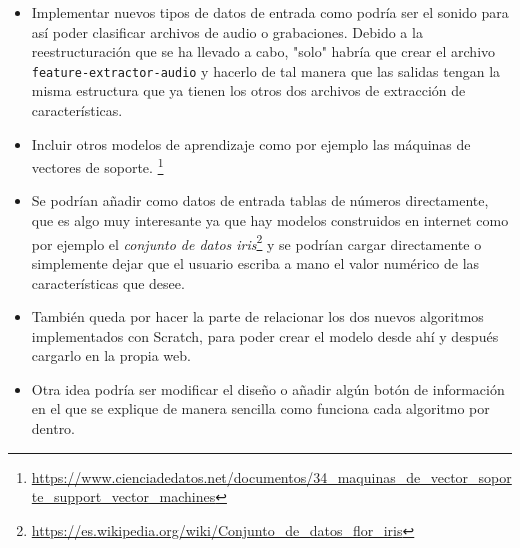 \documentclass[a4paper, 12pt]{book}
\begin{document}
\begin{itemize}
  	\item  Implementar nuevos tipos de datos de entrada como podría ser el sonido para así poder clasificar archivos de audio o grabaciones. Debido a la reestructuración que se ha llevado a cabo, "solo" habría que crear el archivo \texttt{feature-extractor-audio} y hacerlo de tal manera que las salidas tengan la misma estructura que ya tienen los otros dos archivos de extracción de características.

	\item Incluir otros modelos de aprendizaje como por ejemplo las máquinas de vectores de soporte. \footnote{\url{https://www.cienciadedatos.net/documentos/34_maquinas_de_vector_soporte_support_vector_machines}}

	\item Se podrían añadir como datos de entrada tablas de números directamente, que es algo muy interesante ya que hay modelos construidos en internet como por ejemplo el \emph{conjunto de datos iris}\footnote{\url{https://es.wikipedia.org/wiki/Conjunto_de_datos_flor_iris}} y se podrían cargar directamente o simplemente dejar que el usuario escriba a mano el valor numérico de las características que desee. 

	\item También queda por hacer la parte de relacionar los dos nuevos algoritmos implementados con Scratch, para poder crear el modelo desde ahí y después cargarlo en la propia web. 

	\item Otra idea podría ser modificar el diseño o añadir algún botón de información en el que se explique de manera sencilla como funciona cada algoritmo por dentro.
\end{itemize}




\end{document}
